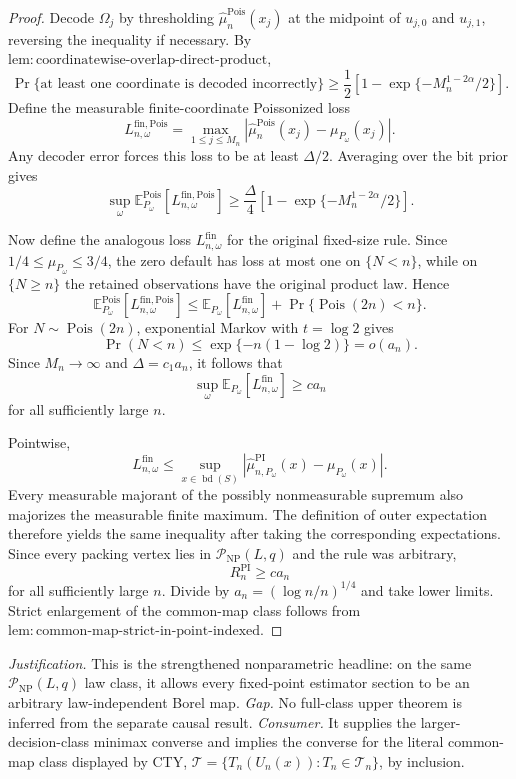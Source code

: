 \documentclass{article}
\begin{document}
\begin{proof}
Decode \(\Omega_j\) by thresholding \(\widehat\mu_n^{\mathrm{Pois}}(x_j)\) at the midpoint of \(u_{j,0}\) and \(u_{j,1}\), reversing the inequality if necessary.  By \(\mathrm{lem:coordinatewise\text{-}overlap\text{-}direct\text{-}product}\),
\[
 \Pr\{\text{at least one coordinate is decoded incorrectly}\}
 \geq\frac12\left[1-\exp\{-M_n^{1-2\alpha}/2\}\right].
\]
Define the measurable finite-coordinate Poissonized loss
\[
 L_{n,\omega}^{\mathrm{fin,Pois}}
 =\max_{1\leq j\leq M_n}
 \left|\widehat\mu_n^{\mathrm{Pois}}(x_j)-\mu_{P_\omega}(x_j)\right|.
\]
Any decoder error forces this loss to be at least \(\Delta/2\).  Averaging over the bit prior gives
\[
 \sup_\omega\mathbb E_{P_\omega}^{\mathrm{Pois}}
 [L_{n,\omega}^{\mathrm{fin,Pois}}]
 \geq\frac\Delta4
 \left[1-\exp\{-M_n^{1-2\alpha}/2\}\right].
\]

Now define the analogous loss \(L_{n,\omega}^{\mathrm{fin}}\) for the original fixed-size rule.  Since \(1/4\leq\mu_{P_\omega}\leq3/4\), the zero default has loss at most one on \(\{N<n\}\), while on \(\{N\geq n\}\) the retained observations have the original product law.  Hence
\[
 \mathbb E_{P_\omega}^{\mathrm{Pois}}[L_{n,\omega}^{\mathrm{fin,Pois}}]
 \leq \mathbb E_{P_\omega}[L_{n,\omega}^{\mathrm{fin}}]
 +\Pr\{\operatorname{Pois}(2n)<n\}.
\]
For \(N\sim\operatorname{Pois}(2n)\), exponential Markov with \(t=\log2\) gives
\[
 \Pr(N<n)\leq\exp\{-n(1-\log2)\}=o(a_n).
\]
Since \(M_n\to\infty\) and \(\Delta=c_1a_n\), it follows that
\[
 \sup_\omega\mathbb E_{P_\omega}[L_{n,\omega}^{\mathrm{fin}}]\geq ca_n
\]
for all sufficiently large \(n\).

Pointwise,
\[
 L_{n,\omega}^{\mathrm{fin}}
 \leq\sup_{x\in\operatorname{bd}(S)}
 \left|\widehat\mu_{n,P_\omega}^{\mathrm{PI}}(x)-\mu_{P_\omega}(x)\right|.
\]
Every measurable majorant of the possibly nonmeasurable supremum also majorizes the measurable finite maximum.  The definition of outer expectation therefore yields the same inequality after taking the corresponding expectations.  Since every packing vertex lies in \(\mathcal P_{\mathrm{NP}}(L,q)\) and the rule was arbitrary,
\[
 R_n^{\mathrm{PI}}\geq ca_n
\]
for all sufficiently large \(n\).  Divide by \(a_n=(\log n/n)^{1/4}\) and take lower limits.  Strict enlargement of the common-map class follows from \(\mathrm{lem:common\text{-}map\text{-}strict\text{-}in\text{-}point\text{-}indexed}\).
\end{proof}
\par\smallskip\noindent \textit{Justification.} This is the strengthened nonparametric headline: on the same \(\mathcal P_{\mathrm{NP}}(L,q)\) law class, it allows every fixed-point estimator section to be an arbitrary law-independent Borel map. \textit{Gap.} No full-class upper theorem is inferred from the separate causal result. \textit{Consumer.} It supplies the larger-decision-class minimax converse and implies the converse for the literal common-map class displayed by CTY, \(\mathcal T=\{T_n(U_n(x)):T_n\in\mathcal T_n\}\), by inclusion.
\end{document}
